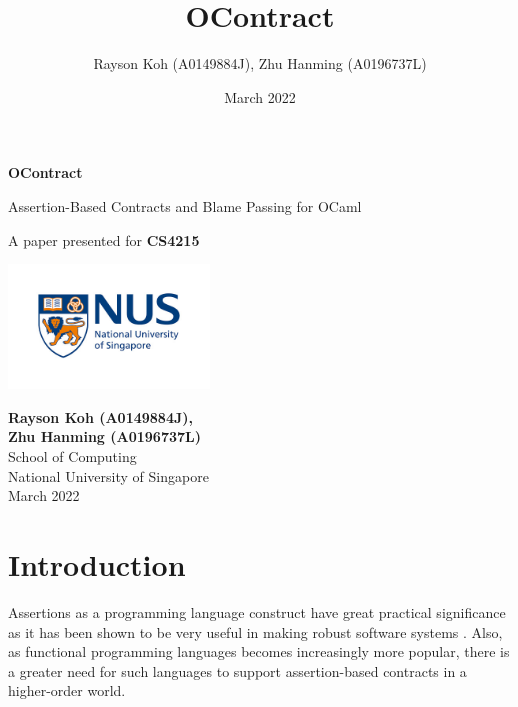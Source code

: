 \documentclass[a4paper]{article}
\title{OContract}
\author{Rayson Koh (A0149884J), Zhu Hanming (A0196737L)}
\date{March 2022}
\begin{document}

\begin{titlepage}
    \begin{center}
        \vspace*{1cm}

        \Huge
        \textbf{OContract}

        \vspace{0.5cm}
        \LARGE
        Assertion-Based Contracts and Blame Passing for OCaml

        \vspace{1.5cm}


        \vfill

        A paper presented for \textbf{CS4215}

        \vspace{0.8cm}

        \includegraphics[width=0.4\textwidth]{nus-logo.jpg}

        \Large
        \textbf{Rayson Koh (A0149884J),\\Zhu Hanming (A0196737L)}\\
        School of Computing\\
        National University of Singapore\\
        March 2022

    \end{center}
\end{titlepage}

\tableofcontents
\newpage

\section{Introduction}

Assertions as a programming language construct have great practical significance as it has been shown to be very useful in making robust software systems \cite{rosen}.
Also, as functional programming languages becomes increasingly more popular, there is a greater need for such languages to support assertion-based contracts in a higher-order world.
\end{document}
